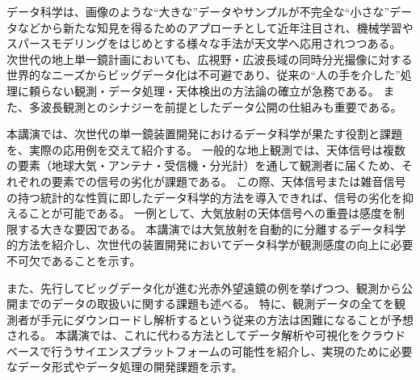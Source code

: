 \documentclass[ja]{2021b}
\begin{document}
データ科学は、画像のような``大きな''データやサンプルが不完全な``小さな''データなどから新たな知見を得るためのアプローチとして近年注目され、機械学習やスパースモデリングをはじめとする様々な手法が天文学へ応用されつつある。
次世代の地上単一鏡計画においても、広視野・広波長域の同時分光撮像に対する世界的なニーズからビッグデータ化は不可避であり、従来の``人の手を介した''処理に頼らない観測・データ処理・天体検出の方法論の確立が急務である。
また、多波長観測とのシナジーを前提としたデータ公開の仕組みも重要である。

本講演では、次世代の単一鏡装置開発におけるデータ科学が果たす役割と課題を、実際の応用例を交えて紹介する。
一般的な地上観測では、天体信号は複数の要素（地球大気・アンテナ・受信機・分光計）を通して観測者に届くため、それぞれの要素での信号の劣化が課題である。
この際、天体信号または雑音信号の持つ統計的な性質に即したデータ科学的方法を導入できれば、信号の劣化を抑えることが可能である。
一例として、大気放射の天体信号への重畳は感度を制限する大きな要因である。
本講演では大気放射を自動的に分離するデータ科学的方法を紹介し、次世代の装置開発においてデータ科学が観測感度の向上に必要不可欠であることを示す。

また、先行してビッグデータ化が進む光赤外望遠鏡の例を挙げつつ、観測から公開までのデータの取扱いに関する課題も述べる。
特に、観測データの全てを観測者が手元にダウンロードし解析するという従来の方法は困難になることが予想される。
本講演では、これに代わる方法としてデータ解析や可視化をクラウドベースで行うサイエンスプラットフォームの可能性を紹介し、実現のために必要なデータ形式やデータ処理の開発課題を示す。

\end{document}
